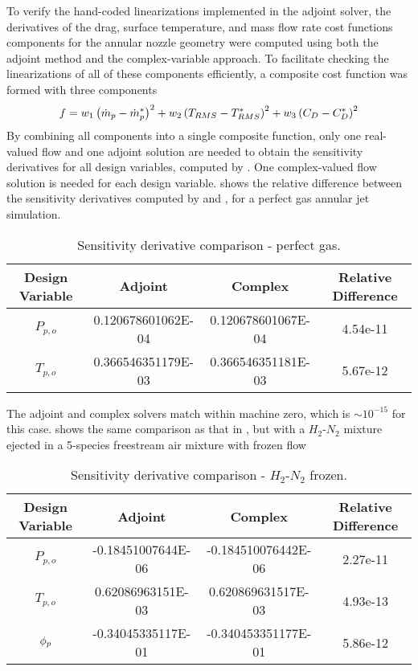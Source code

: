To verify the hand-coded linearizations implemented in the adjoint solver, the
derivatives of the drag, surface temperature, and mass flow rate cost functions
components for the annular nozzle geometry were computed using both the adjoint
method and the complex-variable approach.  To facilitate checking the
linearizations of all of these components efficiently, a composite cost function
was formed with three components
\begin{equation} 
  f = w_1\left( \dot{m}_p - \dot{m}_p^{*}\right)^{2} 
  + w_2\left( T_{RMS} - T_{RMS}^*\right)^2
  + w_3\left( C_{D} - C_{D}^*\right)^2
  \label{check-cost-func}
\end{equation}
By combining all components into a single composite function, only one
real-valued flow and one adjoint solution are needed to obtain the sensitivity
derivatives for all design variables, computed by . One
complex-valued flow solution is needed for each design variable.
 shows the relative difference between the sensitivity
derivatives computed by  and , for a
perfect gas annular jet simulation.
\begin{table}[h]
  \centering 
  \caption{Sensitivity derivative comparison - perfect gas.}
  \begin{tabular}{c|c|c|c} 
    Design Variable & Adjoint & Complex & Relative Difference \\ 
    \hline 
    $P_{p,o}$ & 0.120678601062E-04 & 0.120678601067E-04 & 4.54e-11 \\
    $T_{p,o}$ & 0.366546351179E-03 & 0.366546351181E-03 & 5.67e-12 
  \end{tabular}
  \label{tab:pg-deriv-check}
\end{table}
The adjoint and complex solvers match within machine zero, which is $\sim
10^{-15}$ for this case.   shows the same
comparison as that in , but with a $H_2$-$N_2$ mixture
ejected in a 5-species freestream air mixture with frozen flow
\begin{table}[h] 
  \centering 
  \caption{Sensitivity derivative comparison - $H_2$-$N_2$ frozen.}
  \begin{tabular}{c|c|c|c} 
    Design Variable & Adjoint & Complex & Relative Difference\\
    \hline 
    $P_{p,o}$ & -0.18451007644E-06 & -0.184510076442E-06 & 2.27e-11 \\ 
    $T_{p,o}$ &  0.62086963151E-03 &  0.620869631517E-03 & 4.93e-13 \\ 
    $\phi_p$     & -0.34045335117E-01 & -0.340453351177E-01 & 5.86e-12 
  \end{tabular}
  \label{tab:frozen-deriv-check}
\end{table}
